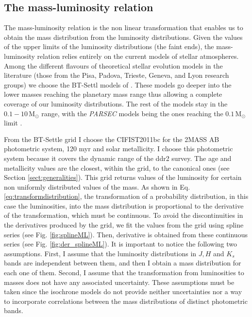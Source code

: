 \subsection{The mass-luminosity relation}
\label{sect:mass-luminosity}
The mass-luminosity relation is the non linear transformation that enables us to obtain the mass distribution from the luminosity distributions. Given the values of the upper limits of the luminosity distributions (the faint ends), the mass-luminosity relation relies entirely on the current models of stellar atmospheres. Among the different flavours of theoretical stellar evolution models in the literature (those from the Pisa, Padova, Trieste, Geneva, and Lyon research groups)  we choose the BT-Settl models of \citet{Allard2012}. These models go deeper into the lower masses reaching the planetary mass range thus allowing a complete coverage of our luminosity distributions. The rest of the models stay in the $0.1-10\,\mathrm{M_{\odot}}$ range, with the \emph{PARSEC} models being the ones reaching the $0.1\,\mathrm{M_{\odot}}$ limit \citep{Bressan2012}. 

From the BT-Settle grid I choose the CIFIST2011bc for the 2MASS AB photometric system, 120 \gls{myr} and solar metallicity. I choose this photometric system because it covers the dynamic range of the \gls{ddr2} survey. The age and metallicity values are the closest, within the grid, to the canonical ones (see Section \ref{sect:generalities}). This grid returns values of the luminosity for certain non uniformly distributed values of the mass. As shown in Eq. \ref{eq:transformdistribution}, the transformation of a probability distribution, in this case the luminosities, into the mass distribution is proportional to the derivative of the transformation, which must be continuous. To avoid the discontinuities in the derivatives produced by the grid, we fit the values from the grid using spline series (see Fig. \ref{fig:splineML}). Then, derivative is obtained from these continuous series (see Fig. \ref{fig:der_splineML}). It is important to notice the following two assumptions. First, I assume that the luminosity distributions in $J,H$ and $K_s$ bands are independent between them, and then I obtain a mass distribution for each one of them. Second, I assume that the transformation from luminosities to masses does not have any associated uncertainty. These assumptions must be taken since the isochrone models do not provide neither uncertainties nor a way to incorporate correlations between the mass distributions of distinct photometric bands. 

